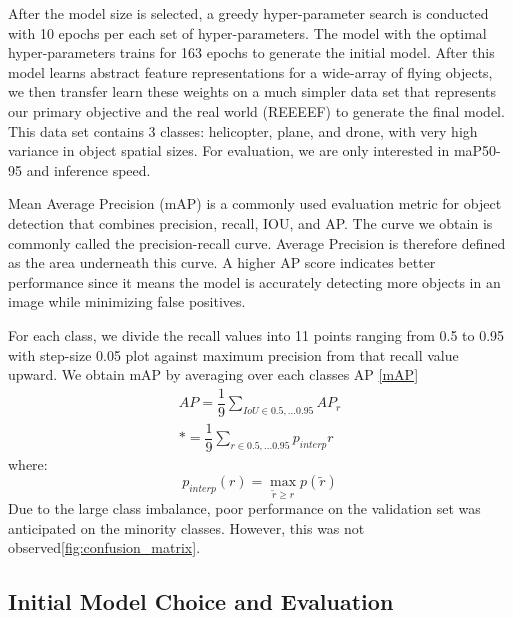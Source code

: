 \documentclass[10pt,twocolumn,letterpaper]{article}
\begin{document}
After the model size is selected, a greedy hyper-parameter search is conducted with 10 epochs per each set of hyper-parameters. The model with the optimal hyper-parameters trains for 163 epochs to generate the initial model. After this model learns abstract feature representations for a wide-array of flying objects, we then transfer learn these weights on a much simpler data set that represents our primary objective and the real world (REEEEF) to generate the final model. This data set contains 3 classes: helicopter, plane, and drone, with very high variance in object spatial sizes. For evaluation, we are only interested in maP50-95 and inference speed.

Mean Average Precision (mAP) is a commonly used evaluation metric for object detection that combines precision, recall, IOU, and AP. The curve we obtain is commonly called the precision-recall curve. Average Precision is therefore defined as the area underneath this curve. A higher AP score indicates better performance since it means the model is accurately detecting more objects in an image while minimizing false positives.

For each class, we divide the recall values into 11 points ranging from 0.5 to 0.95 with step-size 0.05 plot against maximum precision from that recall value upward. We obtain mAP by averaging over each classes AP \ref{mAP}\\ 

\begin{align}\label{mAP}
AP=\dfrac{1}{9}\sum_{IoU\in{0.5,...0.95}}AP_r \\*
=\dfrac{1}{9}\sum_{r\in{0.5,...0.95}}p_{interp}{r}
\end{align}
where:
\begin{equation*}
p_{interp}({r}) = \max_{\widetilde{r}\geq{r}} p(\widetilde{r})
\end{equation*}
Due to the large class imbalance, poor performance on the validation set was anticipated on the minority classes. However, this was not observed\ref{fig:confusion_matrix}.

\subsection{Initial Model Choice and Evaluation}
\end{document}
